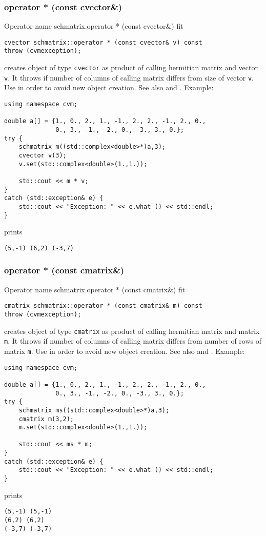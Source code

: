 \subsubsection{operator * (const cvector\&)}
Operator%
\pdfdest name {schmatrix.operator * (const cvector&)} fit
\begin{verbatim}
cvector schmatrix::operator * (const cvector& v) const
throw (cvmexception);
\end{verbatim}
creates  object of type \verb"cvector"
as  product of  calling hermitian matrix and  vector \verb"v".
It throws  
if  number of columns of  calling matrix
differs from  size of  vector \verb"v".
Use 
in order to avoid new object creation.
See also
 and .
Example:
\begin{Verbatim}
using namespace cvm;

double a[] = {1., 0., 2., 1., -1., 2., 2., -1., 2., 0.,
              0., 3., -1., -2., 0., -3., 3., 0.};
try {
    schmatrix m((std::complex<double>*)a,3);
    cvector v(3);
    v.set(std::complex<double>(1.,1.));

    std::cout << m * v;
}
catch (std::exception& e) {
    std::cout << "Exception: " << e.what () << std::endl;
}
\end{Verbatim}
prints
\begin{Verbatim}
(5,-1) (6,2) (-3,7)
\end{Verbatim}
\newpage



\subsubsection{operator * (const cmatrix\&)}
Operator%
\pdfdest name {schmatrix.operator * (const cmatrix&)} fit
\begin{verbatim}
cmatrix schmatrix::operator * (const cmatrix& m) const
throw (cvmexception);
\end{verbatim}
creates  object of type \verb"cmatrix"
as  product of  calling hermitian matrix and  matrix \verb"m".
It throws  
if  number of columns of  calling matrix
differs from  number of rows of  matrix \verb"m".
Use  in order to avoid
 new object creation.
See also
 and .
Example:
\begin{Verbatim}
using namespace cvm;

double a[] = {1., 0., 2., 1., -1., 2., 2., -1., 2., 0.,
              0., 3., -1., -2., 0., -3., 3., 0.};
try {
    schmatrix ms((std::complex<double>*)a,3);
    cmatrix m(3,2);
    m.set(std::complex<double>(1.,1.));

    std::cout << ms * m;
}
catch (std::exception& e) {
    std::cout << "Exception: " << e.what () << std::endl;
}
\end{Verbatim}
prints
\begin{Verbatim}
(5,-1) (5,-1)
(6,2) (6,2)
(-3,7) (-3,7)
\end{Verbatim}
\newpage




